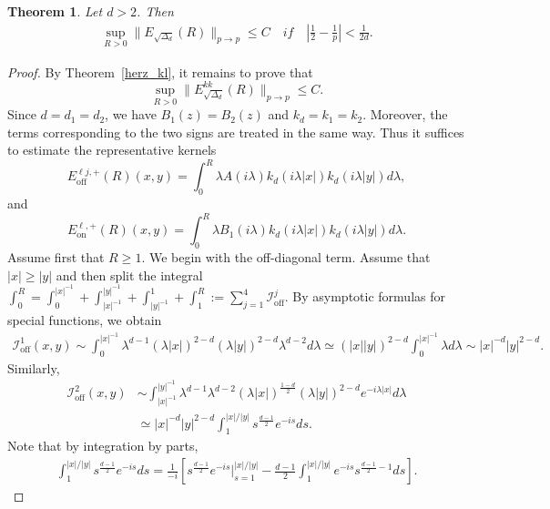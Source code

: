 \documentclass[12pt]{amsart}
\newcommand\Lapdd{\Delta_{d}}
\newtheorem{theorem}{Theorem}[section]
\begin{document}
\begin{theorem}\label{herz_doubling}
Let $d>2$. Then 
\begin{align*}
    \sup_{R>0} \| E_{\sqrt{\Lapdd}}(R)\|_{p \to p} \le C \quad \textit{if} \quad 
        \left| \frac{1}{2} - \frac{1}{p} \right| < \frac{1}{2d}.
\end{align*}
\end{theorem}




\begin{proof}
By Theorem~\ref{herz_kl}, it remains to prove that
\begin{equation*}
    \sup_{R>0} \| E_{\sqrt{\Lapdd}}^{kk}(R) \|_{p\to p}\le C.
\end{equation*}
Since $d=d_1=d_2$, we have $B_1(z)=B_2(z)$ and $k_d=k_1=k_2$. Moreover, the terms corresponding to the two signs are treated in the same way. Thus it suffices to estimate the representative kernels
\begin{equation*}
    E_{\mathrm{off}}^{\ell j,+}(R)(x,y) = \int_0^R  \lambda  A(i\lambda) k_d( i\lambda |x|) k_d( i\lambda |y|) d\lambda,
\end{equation*}
and
\begin{equation*}
    E_{\mathrm{on}}^{\ell,+}(R)(x,y) =  \int_0^R \lambda B_1( i\lambda) k_d( i\lambda |x|) k_d( i\lambda |y|) d\lambda.
\end{equation*}
Assume first that $R\ge 1$. We begin with the off-diagonal term. 
 Assume that $|x|\ge |y|$ and then split the integral $\int_0^R = \int_0^{|x|^{-1}} + \int_{|x|^{-1}}^{|y|^{-1}}+\int_{|y|^{-1}}^1 + \int_1^R:= \sum_{j=1}^4 \mathcal{I}_{\mathrm{off}}^j$. By asymptotic formulas for special functions, we obtain
\begin{align*}
    \mathcal{I}_{\mathrm{off}}^1(x,y) \sim \int_0^{|x|^{-1}} \lambda^{d-1} (\lambda |x|)^{2-d} (\lambda |y|)^{2-d} \lambda^{d-2} d\lambda \simeq (|x||y|)^{2-d} \int_0^{|x|^{-1}} \lambda d\lambda \sim |x|^{-d} |y|^{2-d}.
\end{align*}
Similarly,
\begin{align*}
    \mathcal{I}_{\mathrm{off}}^2(x,y) &\sim \int_{|x|^{-1}}^{|y|^{-1}} \lambda^{d-1} \lambda^{d-2} (\lambda |x|)^{\frac{1-d}{2}} (\lambda |y|)^{2-d} e^{- i\lambda |x|} d\lambda\\
    & \simeq |x|^{-d} |y|^{2-d} \int_1^{|x|/|y|} s^{\frac{d-1}{2}} e^{- is} ds.
\end{align*}
Note that by integration by parts,
\begin{align*}
    \int_1^{|x|/|y|} s^{\frac{d-1}{2}} e^{- is} ds = \frac{1}{- i} \left[ s^{\frac{d-1}{2}}e^{- is}\big|_{s=1}^{|x|/|y|} - \frac{d-1}{2} \int_1^{|x|/|y|} e^{- is} s^{\frac{d-1}{2}-1} ds \right].

\end{align*}
\end{proof}
\end{document}
